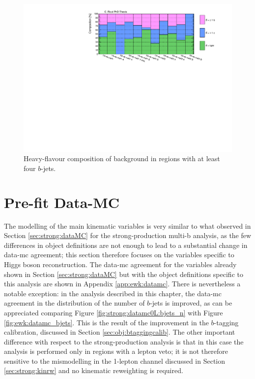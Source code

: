 \begin{figure}[htbp]
\includegraphics[width=\textwidth]{figures/ewk_prod/comp_plots/hh_4b_HF.pdf}
\caption{Heavy-flavour composition of \ttbar background in regions with at least four $b$-jets.}
	\label{fig:HFcomp_hh4b}
\end{figure}

\FloatBarrier

\section{Pre-fit Data-MC}

The modelling of the main kinematic variables is very similar to what observed in Section \ref{sec:strong:dataMC} 
for the strong-production multi-b analysis, as the few differences in object definitions are not enough to 
lead to a substantial change in data-\gls{mc} agreement; 
this section therefore focuses on the variables specific to Higgs boson reconstruction.
The data-\gls{mc} agreement for the variables already shown in Section \ref{sec:strong:dataMC} but with the object definitions 
specific to this analysis are shown in Appendix \ref{app:ewk:datamc}.
There is nevertheless a notable exception: in the analysis described in this chapter, the data-\gls{mc} agreement in the 
distribution of the number of $b$-jets is improved, as can be appreciated comparing Figure \ref{fig:strong:datamc0L:bjets_n} with Figure \ref{fig:ewk:datamc_bjets}.
This is the result of the improvement in the $b$-tagging calibration, discussed in Section \ref{sec:obj:btaggingcalib}.
The other important difference with respect to the strong-production analysis is that in this case the analysis is performed 
only in regions with a lepton veto; it is not therefore sensitive to the mismodelling in the 1-lepton channel discussed in Section 
\ref{sec:strong:kinrw} and no kinematic reweighting is required. 

